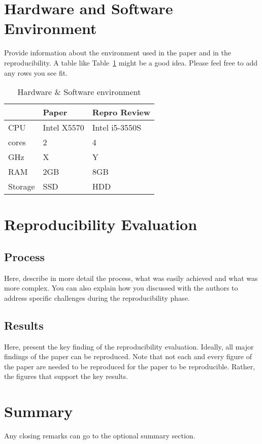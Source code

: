 \documentclass[acmsmall,nonacm]{acmart}
\begin{document}
\section{Hardware and Software Environment}
Provide information about the environment used in the paper and in the reproducibility. A table like Table~\ref{tab:environment} might be a good idea. Please feel free to add any rows you see fit.

\begin{table}[h]
  \caption{Hardware \& Software environment}
  \label{tab:environment}
  \begin{tabular}{lll}
    \toprule
     & Paper & Repro Review\\
    \midrule
    CPU & Intel X5570 & Intel i5-3550S\\
    cores & 2 & 4 \\
    GHz & X & Y \\
    RAM & 2GB & 8GB \\
    Storage & SSD & HDD \\
  \bottomrule
\end{tabular}
\end{table}


\section{Reproducibility Evaluation}

\subsection{Process}
Here, describe in more detail the process, what was easily achieved and what was more complex. You can also explain how you discussed with the authors to address specific challenges during the reproducibility phase.

\subsection{Results}
Here, present the key finding of the reproducibility evaluation. Ideally, all major findings of the paper can be reproduced. Note that not each and every figure of the paper are needed to be reproduced for the paper to be reproducible. Rather, the figures that support the key results. 

\section{Summary}
Any closing remarks can go to the optional summary section.




 
\end{document}
